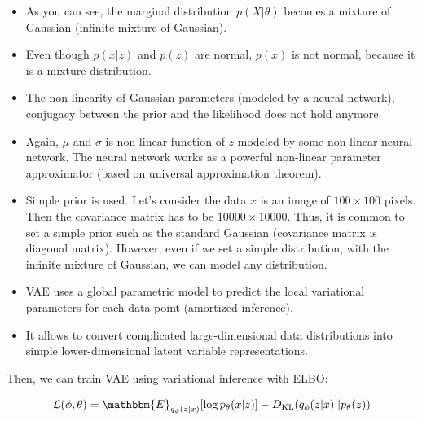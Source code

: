 \begin{itemize}
	\item As you can see, the marginal distribution $p(X|\theta)$ becomes a mixture of Gaussian (infinite mixture of Gaussian). 
	\item Even though $p(x|z)$ and $p(z)$ are normal, $p(x)$ is not normal, because it is a mixture distribution.
	\item The non-linearity of Gaussian parameters (modeled by a neural network), conjugacy between the prior and the likelihood does not hold anymore.
	\item Again, $\mu$ and $\sigma$ is non-linear function of $z$ modeled by some non-linear neural network. The neural network works as a powerful non-linear parameter approximator (based on universal approximation theorem). 
	\item Simple prior is used. Let's consider the data $x$ is an image of $100\times 100$ pixels. Then the covariance matrix has to be $10000\times 10000$. Thus, it is common to set a simple prior such as the standard Gaussian (covariance matrix is diagonal matrix). However, even if we set a simple distribution, with the infinite mixture of Gaussian, we can model any distribution.
	\item VAE uses a global parametric model to predict the local
		variational parameters for each data point (amortized inference). 
	\item It allows to convert complicated large-dimensional data distributions into simple lower-dimensional latent variable representations.  
\end{itemize}

Then, we can train VAE using variational inference with ELBO:

$$\mathcal{L}(\phi,\theta) = \mathbbm{E}_{q_{\phi}(z|x)}[\log p_{\theta}(x|z)] - D_{\textrm{KL}}(q_{\phi}(z|x)||p_{\theta}(z))$$

